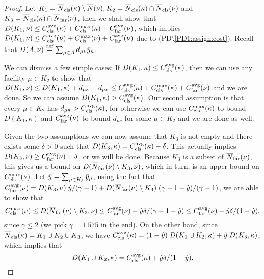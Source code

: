 \documentclass[11pt]{article}
\begin{document}
\begin{proof}
  Let $K_1 = {\overline{N}}_{\text{cls}}(\kappa) \setminus {\overline{N}}(\nu), K_2 =
  {\overline{N}}_{\text{cls}}(\kappa) \cap {\overline{N}}_{\text{cls}}(\nu)$ and $K_3 =
  {\overline{N}}_{\text{cls}}(\kappa) \cap {\overline{N}}_{\text{far}}(\nu)$, then we shall show that
  $D(K_1, \nu) \leq C_{\text{cls}}^{{\mbox{\scriptsize\rm avg}}}(\kappa)+C_{\text{cls}}^{\max}(\kappa)+C_{\text{far}}^{{\mbox{\scriptsize\rm avg}}}(\nu)$,
  which implies $D(K_1, \nu) \leq
  C_{\text{cls}}^{{\mbox{\scriptsize\rm avg}}}(\nu)+C_{\text{cls}}^{\max}(\nu)+C_{\text{far}}^{{\mbox{\scriptsize\rm avg}}}(\nu)$ due to
  (PD'.\ref{PD1:assign:cost}). Recall that $D(A,\nu)
  \stackrel{\mathrm{def}}{=} \sum_{\mu\in A} d_{\mu\nu}{\bar y}_{\mu}$.

  We can dismiss a few simple cases: If $D(K_1, \kappa) \leq
  C_{\text{cls}}^{{\mbox{\scriptsize\rm avg}}}(\kappa)$, then we can use any facility $\mu \in K_2$ to
  show that $D(K_1,\nu) \leq D(K_1, \kappa) + d_{\mu\kappa} +
  d_{\mu\nu} \leq C_{\text{cls}}^{{\mbox{\scriptsize\rm avg}}}(\kappa) + C_{\text{cls}}^{\max}(\kappa) + C_{\text{far}}^{{\mbox{\scriptsize\rm avg}}}(\nu)$
  and we are done. So we can assume $D(K_1, \kappa) >
  C_{\text{cls}}^{{\mbox{\scriptsize\rm avg}}}(\kappa)$. Our second assumption is that every $\mu \in K_2$
  has $d_{\mu\kappa} > C_{\text{cls}}^{{\mbox{\scriptsize\rm avg}}}(\kappa)$, for otherwise we can use
  $C_{\text{cls}}^{\max}(\kappa)$ to bound $D(K_1, \kappa)$ and $C_{\text{far}}^{{\mbox{\scriptsize\rm avg}}}(\nu)$ to
  bound $d_{\mu\nu}$ for some $\mu\in K_2$ and we are done as well.

  Given the two assumptions we can now assume that $K_3$ is not empty
  and there exists some $\delta > 0$ such that $D(K_3, \kappa) =
  C_{\text{cls}}^{{\mbox{\scriptsize\rm avg}}}(\kappa) - \delta$. This actually implies $D(K_3, \nu) \geq
  C_{\text{far}}^{{\mbox{\scriptsize\rm avg}}}(\nu) + \delta$, or we will be done. Because $K_3$ is a
  subset of ${\overline{N}}_{\text{far}}(\nu)$, this gives us a bound on
  $D({\overline{N}}_{\text{far}}(\nu) \setminus K_3, \nu)$, which in turn, is an upper
  bound on $C_{\text{cls}}^{\max}(\nu)$. Let $\hat{y} = \sum_{\mu\in K_3}
  {\bar y}_{\mu}$, using the fact that $C_{\text{far}}^{{\mbox{\scriptsize\rm avg}}}(\nu) = D(K_3,\nu)\;
  \hat{y}/(\gamma-1) + D({\overline{N}}_{\text{far}}(\nu)\setminus K_3)\;
  (\gamma-1-\hat{y})/(\gamma-1)$, we are able to show that
  \begin{equation*}
    C_{\text{cls}}^{\max}(\nu) \leq D({\overline{N}}_{\text{far}}(\nu) \setminus K_3, \nu) \leq C_{\text{far}}^{{\mbox{\scriptsize\rm avg}}}(\nu) -
    \hat{y}\delta/(\gamma-1-\hat{y}) \leq C_{\text{far}}^{{\mbox{\scriptsize\rm avg}}}(\nu) -
    \hat{y}\delta/(1-\hat{y}),
  \end{equation*}
  since $\gamma \leq 2$ (we pick $\gamma=1.575$ in the end). On the
  other hand, since ${\overline{N}}_{\text{cls}}(\kappa) = K_1 \cup K_2 \cup K_3$, we
  have $C_{\text{cls}}^{{\mbox{\scriptsize\rm avg}}}(\kappa) = (1-\hat{y})\; D(K_1\cup K_2, \kappa) +
  \hat{y}\; D(K_3, \kappa)$, which implies that
  \begin{equation*}
    D(K_1 \cup K_2, \kappa) = C_{\text{cls}}^{{\mbox{\scriptsize\rm avg}}}(\kappa) + \hat{y}\delta/(1-\hat{y}).
  \end{equation*}


\end{proof}
\end{document}
